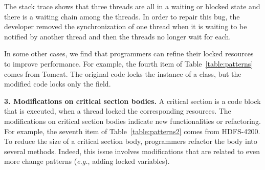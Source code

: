 The stack trace shows that three threads are all in a waiting or blocked state and there is a waiting chain among the threads. In order to repair this bug, the developer removed the synchronization of one thread when it is waiting to be notified by another thread and then the threads no longer wait for each.



In some other cases, we find that programmers can refine their locked resources to improve performance. For example, the fourth item of Table~\ref{table:patterns} comes from Tomcat. The original code locks the instance of a class, but the modified code locks only the  field.

\noindent
\textbf{3. Modifications on critical section bodies.} A critical section is a code block that is executed, when a thread locked the corresponding resources. The modifications on critical section bodies indicate new functionalities or refactoring. For example, the seventh item of Table~\ref{table:patterns2} comes from HDFS-4200. To reduce the size of a critical section body, programmers refactor the body into several methods. Indeed, this issue involves modifications that are related to even more change patterns (\emph{e.g.}, adding locked variables).


